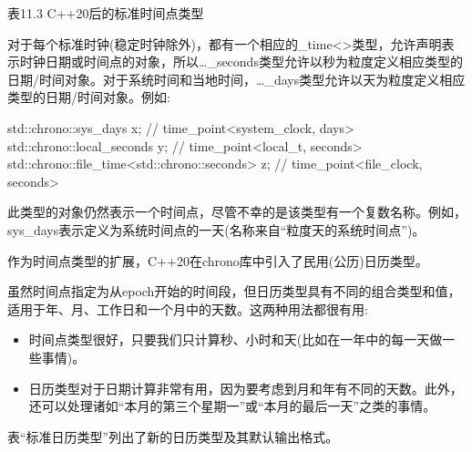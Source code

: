 \begin{center}
表11.3 C++20后的标准时间点类型
\end{center}

对于每个标准时钟(稳定时钟除外)，都有一个相应的\_time<>类型，允许声明表示时钟日期或时间点的对象，所以…\_seconds类型允许以秒为粒度定义相应类型的日期/时间对象。对于系统时间和当地时间，…\_days类型允许以天为粒度定义相应类型的日期/时间对象。例如:

\begin{cpp}
std::chrono::sys_days x; // time_point<system_clock, days>
std::chrono::local_seconds y; // time_point<local_t, seconds>
std::chrono::file_time<std::chrono::seconds> z; // time_point<file_clock, seconds>
\end{cpp}

此类型的对象仍然表示一个时间点，尽管不幸的是该类型有一个复数名称。例如，sys\_days表示定义为系统时间点的一天(名称来自“粒度天的系统时间点”)。


作为时间点类型的扩展，C++20在chrono库中引入了民用(公历)日历类型。

虽然时间点指定为从epoch开始的时间段，但日历类型具有不同的组合类型和值，适用于年、月、工作日和一个月中的天数。这两种用法都很有用:

\begin{itemize}
\item
时间点类型很好，只要我们只计算秒、小时和天(比如在一年中的每一天做一些事情)。

\item
日历类型对于日期计算非常有用，因为要考虑到月和年有不同的天数。此外，还可以处理诸如“本月的第三个星期一”或“本月的最后一天”之类的事情。
\end{itemize}

表“标准日历类型”列出了新的日历类型及其默认输出格式。

